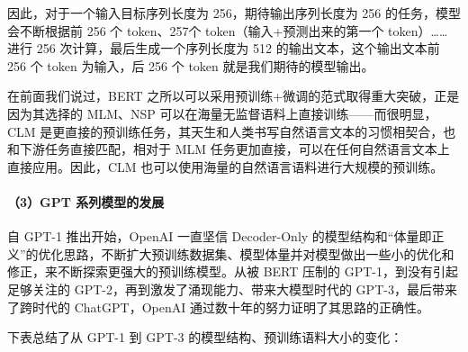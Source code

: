 \documentclass[12pt,a4paper]{book}
\begin{document}
因此，对于一个输入目标序列长度为 256，期待输出序列长度为 256
的任务，模型会不断根据前 256 个 token、257个
token（输入+预测出来的第一个 token）\ldots\ldots{} 进行 256
次计算，最后生成一个序列长度为 512 的输出文本，这个输出文本前 256 个
token 为输入，后 256 个 token 就是我们期待的模型输出。

在前面我们说过，BERT
之所以可以采用预训练+微调的范式取得重大突破，正是因为其选择的 MLM、NSP
可以在海量无监督语料上直接训练------而很明显，CLM
是更直接的预训练任务，其天生和人类书写自然语言文本的习惯相契合，也和下游任务直接匹配，相对于
MLM 任务更加直接，可以在任何自然语言文本上直接应用。因此，CLM
也可以使用海量的自然语言语料进行大规模的预训练。

\paragraph{（3）GPT
系列模型的发展}\label{gpt-ux7cfbux5217ux6a21ux578bux7684ux53d1ux5c55}

自 GPT-1 推出开始，OpenAI 一直坚信 Decoder-Only
的模型结构和``体量即正义''的优化思路，不断扩大预训练数据集、模型体量并对模型做出一些小的优化和修正，来不断探索更强大的预训练模型。从被
BERT 压制的 GPT-1，到没有引起足够关注的
GPT-2，再到激发了涌现能力、带来大模型时代的 GPT-3，最后带来了跨时代的
ChatGPT，OpenAI 通过数十年的努力证明了其思路的正确性。

下表总结了从 GPT-1 到 GPT-3 的模型结构、预训练语料大小的变化：
\end{document}
